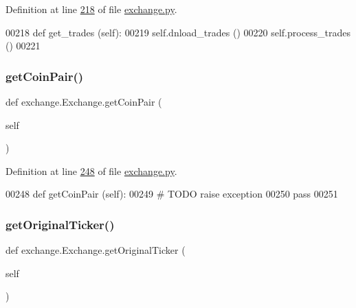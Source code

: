 Definition at line \hyperlink{exchange_8py_source_l00218}{218} of file \hyperlink{exchange_8py_source}{exchange.\+py}.


\begin{DoxyCode}
00218     \textcolor{keyword}{def }get\_trades (self):
00219         self.dnload\_trades ()
00220         self.process\_trades ()
00221     
\end{DoxyCode}
\mbox{\label{classexchange_1_1_exchange_aa0c6b78e855daec381fe180fd4dbbf1e}} 
\subsubsection{\texorpdfstring{get\+Coin\+Pair()}{getCoinPair()}}
{\footnotesize\ttfamily def exchange.\+Exchange.\+get\+Coin\+Pair (\begin{DoxyParamCaption}\item[{}]{self }\end{DoxyParamCaption})}



Definition at line \hyperlink{exchange_8py_source_l00248}{248} of file \hyperlink{exchange_8py_source}{exchange.\+py}.


\begin{DoxyCode}
00248     \textcolor{keyword}{def }getCoinPair (self):
00249         \textcolor{comment}{# TODO raise exception}
00250         \textcolor{keywordflow}{pass}
00251         
\end{DoxyCode}
\mbox{\label{classexchange_1_1_exchange_a6925ebc9654ca9120d70fd0105399dc3}} 
\subsubsection{\texorpdfstring{get\+Original\+Ticker()}{getOriginalTicker()}}
{\footnotesize\ttfamily def exchange.\+Exchange.\+get\+Original\+Ticker (\begin{DoxyParamCaption}\item[{}]{self }\end{DoxyParamCaption})}



